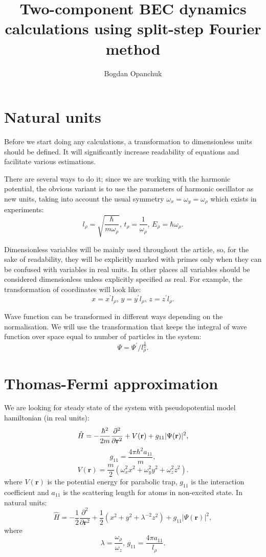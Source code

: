 \documentclass[12pt,notitlepage]{report}
\title{Two-component BEC dynamics calculations using split-step Fourier method}
\author{Bogdan Opanchuk}
\begin{document}
\maketitle

\section*{Natural units}

Before we start doing any calculations, a transformation to dimensionless units should be defined. It will significantly increase readability of equations and facilitate various estimations.

There are several ways to do it; since we are working with the harmonic potential, the obvious variant is to use the parameters of harmonic oscillator as new units, taking into account the usual symmetry $\omega_x = \omega_y = \omega_\rho$ which exists in experiments:
\[ l_\rho =  \sqrt{\frac{\hbar}{m\omega_\rho}},\, t_\rho = \frac{1}{\omega_\rho},\, E_\rho = \hbar \omega_\rho. \]

Dimensionless variables will be mainly used throughout the article, so, for the sake of readability, they will be explicitly marked with primes only when they can be confused with variables in real units. In other places all variables should be considered dimensionless unless explicitly specified as real. For example, the transformation of coordinates will look like:
\[ x = x^\prime l_\rho,\, y = y^\prime l_\rho,\, z = z^\prime l_\rho. \]

Wave function can be transformed in different ways depending on the normalisation. We will use the transformation that keeps the integral of wave function over space equal to number of particles in the system:
\[ \Psi = \Psi^\prime / l_\rho^\frac{3}{2}. \]

\section*{Thomas-Fermi approximation}

We are looking for steady state of the system with pseudopotential model hamiltonian (in real units):
\[ 
\hat{H} = -\frac{\hbar^2}{2m} \frac{\partial^2}{\partial \mathbf{r}^2} + \\
V(\mathbf{r}) + g_{11} \vert \Psi(\mathbf{r}) \vert^2,
\]
\[ g_{11} = \frac{4 \pi \hbar^2 a_{11}}{m}, \]
\[ V(\mathbf{r}) = \frac{m}{2} \left( \omega_x^2 x^2 + \omega_y^2 y^2 + \omega_z^2 z^2 \right). \]
where $V(\mathbf{r})$ is the potential energy for parabolic trap, $g_{11}$ is the interaction coefficient and $a_{11}$ is the scattering length for atoms in non-excited state. In natural units:
\[
\hat{H} = -\frac{1}{2} \frac{\partial^2}{\partial \mathbf{r}^2} + 
\frac{1}{2} \left( x^2 + y^2 + \lambda^{-2} z^2 \right) + g_{11} \vert \Psi(\mathbf{r}) \vert^2,
\]
where
\[ \lambda = \frac{\omega_\rho}{\omega_z},\, g_{11} = \frac{4 \pi a_{11}}{l_\rho}. \]
\end{document}
